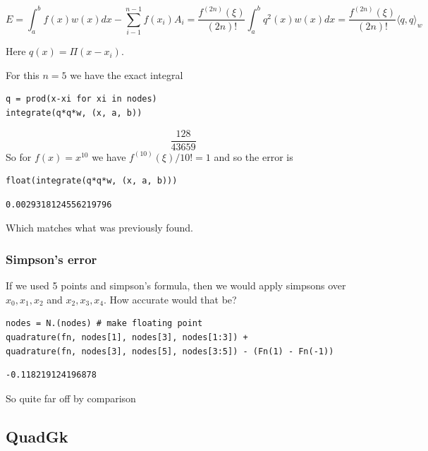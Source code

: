 \documentclass[12pt]{article}
\begin{document}
$$
E = \int_a^b f(x) w(x)dx - \sum_{i-1}^{n-1} f(x_i) A_i
= \frac{f^{(2n)}(\xi)}{(2n)!} \int_a^b q^2(x) w(x) dx
= \frac{f^{(2n)}(\xi)}{(2n)!} \langle q,q \rangle_w
$$



Here $q(x) = \Pi(x - x_i)$.


For this $n=5$ we have the exact integral

\begin{Verbatim}[framesep=1mm,frame=leftline,fontfamily=courier,formatcom=\color{darker-gray}]
q = prod(x-xi for xi in nodes)
integrate(q*q*w, (x, a, b))
\end{Verbatim}
\begin{equation*}\frac{128}{43659}\end{equation*}
So for $f(x) = x^{10}$  we have $f^{(10)}(\xi)/10! = 1$ and so the error is

\begin{Verbatim}[framesep=1mm,frame=leftline,fontfamily=courier,formatcom=\color{darker-gray}]
float(integrate(q*q*w, (x, a, b)))
\end{Verbatim}
\begin{Verbatim}[framesep=3mm,frame=leftline, fontshape=it,formatcom=\color{darker-gray}]
0.0029318124556219796
\end{Verbatim}
 

Which matches what was previously found.

\subsubsection{Simpson's error}


If we used 5 points and simpson's formula, then we would apply simpsons over $x_0, x_1, x_2$ and $x_2, x_3, x_4$. How accurate would that be?

\begin{Verbatim}[framesep=1mm,frame=leftline,fontfamily=courier,formatcom=\color{darker-gray}]
nodes = N.(nodes) # make floating point
quadrature(fn, nodes[1], nodes[3], nodes[1:3]) +
quadrature(fn, nodes[3], nodes[5], nodes[3:5]) - (Fn(1) - Fn(-1))
\end{Verbatim}
\begin{Verbatim}[framesep=3mm,frame=leftline, fontshape=it,formatcom=\color{darker-gray}]
-0.118219124196878
\end{Verbatim}
 

So quite far off by comparison

\subsection{QuadGk}
\end{document}
